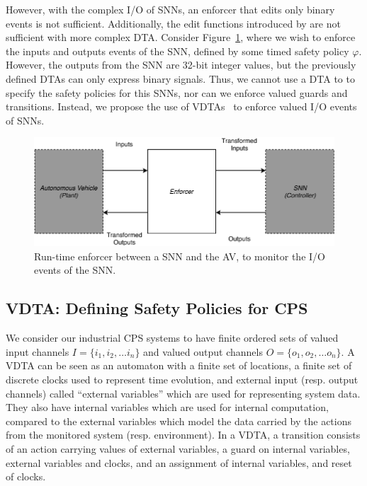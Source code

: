 However, with the complex I/O of \acp{SNN}, an enforcer that edits only binary events is not sufficient.
Additionally, the edit functions introduced by \cite{recps} are not sufficient with more complex \ac{DTA}.
Consider Figure~\ref{fig:re}, where we wish to enforce the inputs and outputs events of the \ac{SNN}, defined by some timed safety policy $\varphi$.
However, the outputs from the \ac{SNN} are 32-bit integer values, but the previously defined \acp{DTA} can only express binary signals.
Thus, we cannot use a \ac{DTA} to to specify the safety policies for this \acp{SNN}, nor can we enforce valued guards and transitions.
Instead, we propose the use of \acfp{VDTA}~\cite{rv-snn} to enforce valued I/O events of \acp{SNN}.

\begin{figure}[h]
	\centering
	\includegraphics[width=0.8\linewidth]{Content/Fig/RE.pdf}
	\caption{Run-time enforcer between a \ac{SNN} and the \acf{AV}, to monitor the I/O events of the \ac{SNN}. \label{fig:re}}
\end{figure} 

\subsection{\acf{VDTA}: Defining Safety Policies for \ac{CPS}}

We consider our industrial \ac{CPS} systems to have finite ordered sets of valued input channels ${I} = \{{i_1}, {i_2}, \ldots {i_n}\}$ and valued output channels ${O} = \{{o_1}, {o_2}, \ldots {o_n}\}$.
A VDTA can be seen as an automaton with a finite set of locations, a finite set of discrete clocks used to represent time evolution, and external input (resp. output channels) called ``external variables'' which are used for representing system data.
They also have internal variables which are used for internal computation, compared to the external variables which model the data carried by the actions from the monitored system (resp. environment). 
In a VDTA, a transition consists of an action carrying values of external variables, a guard on internal variables, external variables and clocks, and an assignment of internal variables, and reset of clocks.

